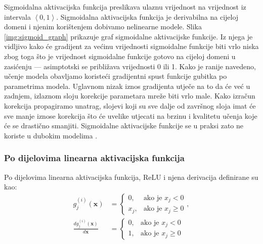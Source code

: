 \documentclass[times, utf8, diplomski, numeric]{fer}
\begin{document}
\noindent Sigmoidalna aktivacijska funkcija preslikava ulaznu vrijednost na vrijednost iz intervala $\left< 0, 1\right>$. Sigmoidalna aktivacijska funkcija je derivabilna na cijeloj domeni i njenim korištenjem dobivamo nelinearne modele. 
Slika \ref{img:sigmoid_graph} prikazuje graf sigmoidalne aktivacijske funkcije. 
Iz njega je vidljivo kako će gradijent za većinu vrijednosti sigmoidalne funkcije biti vrlo niska zbog toga što je vrijednost sigmoidalne funkcije gotovo na cijeloj domeni u zasićenju  — asimptotski se približava vrijednosti 0 ili 1.
Kako je ranije navedeno, učenje modela obavljamo koristeći gradijentni spust funkcije gubitka po parametrima modela. 
Uglavnom nizak iznos gradijenta utječe na to da će već u zadnjem, izlaznom sloju korekcije parametara mreže biti vrlo male. 
Kako izračun korekcija propagiramo unatrag, slojevi koji su sve dalje od završnog sloja imat će sve manje iznose korekcija što će uvelike utjecati na brzinu i kvalitetu učenja koje će se drastično smanjiti.
Sigmoidalne aktivacijske funkcije se u praksi zato ne koriste u dubokim modelima \citep{seminar:rela}.

\subsubsection{Po dijelovima linearna aktivacijska funkcija}
Po dijelovima linearna aktivacijska funkcija, ReLU  i njena derivacija definirane su kao:
\begin{align}
 g^{(i)}_j(\mathbf{x})&=\left\{
 \begin{array}{ll}
 0,  & \mbox{ako je } x_j < 0 \\
 x_j, & \mbox{ako je } x_j \geq 0 
 \end{array}
 \right. , \\
 \frac{dg^{(i)}_j(\mathbf{x})}{d\mathbf{x}}&=\left\{
 \begin{array}{ll}
 0,  & \mbox{ako je } x_j < 0 \\
 1, & \mbox{ako je } x_j \geq 0 
 \end{array}
 \right.
\end{align}
\end{document}
